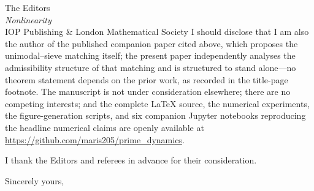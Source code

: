 \documentclass[11pt,a4paper]{letter}
\begin{document}
\begin{letter}{
The Editors \\
\emph{Nonlinearity} \\
IOP Publishing \& London Mathematical Society
}
I should disclose that I am also the author of the published
companion paper cited above, which proposes the unimodal--sieve
matching itself; the present paper independently analyses the
admissibility structure of that matching and is structured to stand
alone---no theorem statement depends on the prior work, as recorded
in the title-page footnote. The manuscript is not under consideration
elsewhere; there are no competing interests; and the complete LaTeX
source, the numerical experiments, the figure-generation scripts, and
six companion Jupyter notebooks reproducing the headline numerical
claims are openly available at
\url{https://github.com/maris205/prime_dynamics}.

I thank the Editors and referees in advance for their consideration.

\closing{Sincerely yours,}

\end{letter}
\end{document}
